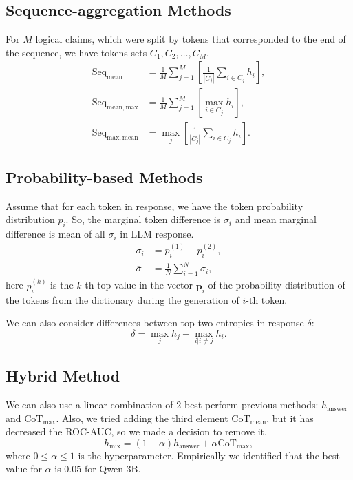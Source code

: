 \subsection{Sequence-aggregation Methods}
For $M$ logical claims, which were split by tokens that corresponded to the end of the sequence, we have tokens sets $C_1, C_2, \ldots, C_M$.
\begin{align*}
\mathrm{Seq}_{\mathrm{mean}} &= \frac{1}{M} \sum_{j=1}^M \left[\frac{1}{|C_j|} \sum_{i \in C_j} h_i \right], \\
\mathrm{Seq}_{\mathrm{mean, max}} &= \frac{1}{M} \sum_{j=1}^M \left[ \max_{i \in C_j} h_i \right], \\    
\mathrm{Seq}_{\mathrm{max, mean}} &= \max_j \left[ \frac{1}{|C_j|} \sum_{i \in C_j} h_i \right].
\end{align*}

\subsection{Probability-based Methods}
Assume that for each token in response, we have the token probability distribution $p_i$. So, the marginal token difference is $\sigma_i$ and mean marginal difference is mean of all $\sigma_i$ in LLM response.
\begin{align*}
\sigma_i &= p_i^(1) - p_i^(2), \\   
\overline{\sigma} &= \frac{1}{N} \sum_{i=1}^N \sigma_i,
\end{align*}
here $p_i^(k)$ is the $k$-th top value in the vector $\mathbf{p}_i$ of the probability distribution of the tokens from the dictionary during the generation of $i$-th token.

We can also consider differences between top two entropies in response $\delta$:
\[
\delta = \max_{j} h_j - \max_{i | i \ne j} h_i.
\]

\subsection{Hybrid Method}
We can also use a linear combination of $2$ best-perform previous methods: $h_{\mathrm{answer}}$ and $\mathrm{CoT}_{\max}$. Also, we tried adding the third element $\mathrm{CoT}_{\mathrm{mean}}$, but it has decreased the ROC-AUC, so we made a decision to remove it.
\[
h_{\mathrm{mix}} = (1 - \alpha) h_{\mathrm{answer}} + \alpha \mathrm{CoT}_{\mathrm{max}},
\]
where $0 \leq \alpha \leq 1$ is the hyperparameter.
Empirically we identified that the best value for $\alpha$ is $0.05$ for Qwen-3B.

